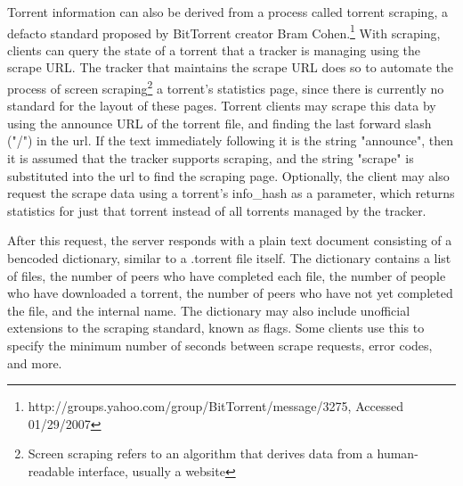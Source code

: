 \documentclass[a4paper,12pt]{report}
\begin{document}
Torrent information can also be derived from a process called torrent scraping, a defacto standard proposed by BitTorrent creator Bram Cohen.\footnote{http://groups.yahoo.com/group/BitTorrent/message/3275, Accessed 01/29/2007}
With scraping, clients can query the state of a torrent that a tracker is managing using the scrape URL. 
The tracker that maintains the scrape URL does so to automate the process of screen scraping\footnote{Screen scraping refers to an algorithm that derives data from a human-readable interface, usually a website} a torrent's statistics page, since there is currently no standard for the layout of these pages. 
Torrent clients may scrape this data by using the announce URL of the torrent file, and finding the last forward slash ("/") in the url. 
If the text immediately following it is the string "announce", then it is assumed that the tracker supports scraping, and the string "scrape" is substituted into the url to find the scraping page. 
Optionally, the client may also request the scrape data using a torrent's info_hash as a parameter, which returns statistics for just that torrent instead of all torrents managed by the tracker. 

After this request, the server responds with a plain text document consisting of a bencoded dictionary, similar to a .torrent file itself. The dictionary contains a list of files, the number of peers who have completed each file, the number of people who have downloaded a torrent, the number of peers who have not yet completed the file, and the internal name. The dictionary may also include unofficial extensions to the scraping standard, known as flags. Some clients use this to specify the minimum number of seconds between scrape requests, error codes, and more.
\end{document}
